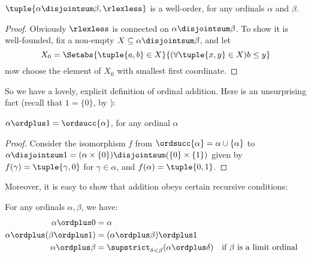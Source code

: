 \documentclass[../../../include/open-logic-section]{subfiles}
\begin{document}
\begin{lem} $\tuple{\alpha \disjointsum \beta, \rlexless}$ is a well-order, for any ordinals $\alpha$ and $\beta$.
\end{lem}
	\begin{proof}
	Obviously $\rlexless$ is connected on $\alpha \disjointsum \beta$. To show it is well-founded, fix a non-empty $X \subseteq \alpha \disjointsum \beta$, and let 
	$$X_0 = \Setabs{\tuple{a, b} \in X}{(\forall \tuple{x, y} \in X)b \leq y}$$
	now choose the element of $X_0$ with smallest first coordinate. 
\end{proof}\noindent 
So we have a lovely, explicit definition of ordinal addition. Here is an unsurprising fact (recall that  $1 = \{0\}$, by ):
\begin{prop}
	$\alpha \ordplus  1 = \ordsucc{\alpha}$, for any ordinal $\alpha$
\end{prop}
\begin{proof}
	Consider the isomorphism $f$ from $\ordsucc{\alpha} = \alpha \cup \{\alpha\}$ to $\alpha\disjointsum1 = (\alpha \times \{0\}) \disjointsum (\{0\} \times \{1\})$ given by $f(\gamma) = \tuple{\gamma, 0}$ for $\gamma \in \alpha$, and $f(\alpha) = \tuple{0, 1}$.
\end{proof}\noindent
Moreover, it is easy to show that addition obeys certain recursive conditions:
\begin{lem}
	For any ordinals $\alpha, \beta$, we have:
	\begin{align*}
		\alpha\ordplus 0 &= \alpha\\
		\alpha \ordplus  (\beta\ordplus 1) &= (\alpha \ordplus  \beta) \ordplus  1\\
		\alpha  \ordplus  \beta &= \supstrict_{\delta < \beta}(\alpha \ordplus  \delta) && \text{if $\beta $ is a limit ordinal}
	\end{align*}
\end{lem}
\end{document}
